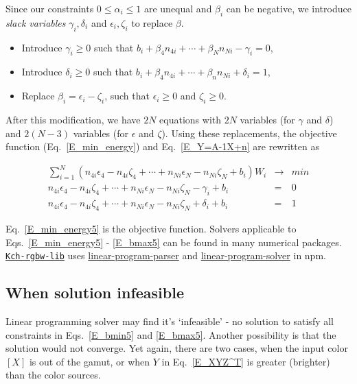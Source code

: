 \documentclass[dvipdfmx,uplatex,a4paper]{article}
\begin{document}
Since our constraints $0 \leq \alpha_i \leq 1$ are unequal and $\beta_i$ can be negative, we introduce \textit{slack variables} $\gamma_i, \delta_i$ and $\epsilon_i, \zeta_i$ to replace $\beta$.

\begin{itemize}
  \item Introduce $\gamma_i \geq 0$ such that $b_i + \beta_4 n_{4i} + \cdots + \beta_N n_{Ni} - \gamma_i = 0$,

  \item Introduce $\delta_i \geq 0$ such that $b_i + \beta_4 n_{4i} + \cdots + \beta_n n_{Ni} + \delta_i = 1$,

  \item Replace $\beta_i = \epsilon_i - \zeta_i$, such that $\epsilon_i \geq 0 $ and $\zeta_i \geq 0$.
\end{itemize}

After this modification, we have $2N$ equations with $2N$ variables (for $\gamma$ and $\delta$) and $2(N-3)$ variables (for $\epsilon$ and $\zeta$). Using these replacements, the objective function (Eq.~\eqref{E_min_energy}) and Eq.~\eqref{E_Y=A-1X+n} are rewritten as

\begin{eqnarray}
%
  \label{E_min_energy5}
  \sum_{i=1}^N (n_{4i} \epsilon_4 - n_{4i} \zeta_4 + \cdots +  n_{Ni} \epsilon_N - n_{Ni} \zeta_N + b_{i}) W_i &\to& min \\
%
  \label{E_bmin5}
  n_{4i} \epsilon_4  - n_{4i} \zeta_4 + \cdots + n_{Ni} \epsilon_N  - n_{Ni} \zeta_N  - \gamma_i + b_i &=& 0 \\
%
  \label{E_bmax5}
  n_{4i} \epsilon_4  - n_{4i} \zeta_4 + \cdots + n_{Ni} \epsilon_N  - n_{Ni} \zeta_N  + \delta_i + b_i &=& 1
\end{eqnarray}

\noindent
Eq.~\eqref{E_min_energy5} is the objective function. Solvers applicable to Eqs.~\eqref{E_min_energy5} - \eqref{E_bmax5} can be found in many numerical packages. \href{https://www.npmjs.com/package/kch-rgbw-lib}{\texttt{Kch-rgbw-lib}} uses \href{https://www.npmjs.com/package/linear-program-parser}{linear-program-parser} and \href{https://www.npmjs.com/package/linear-program-solver}{linear-program-solver} in npm.

\subsection{When solution infeasible}
Linear programming solver may find it's `infeasible' - no solution to satisfy all constraints in Eqs.~\eqref{E_bmin5} and \eqref{E_bmax5}. Another possibility is that the solution would not converge. Yet again, there are two cases, when the input color $[X]$ is out of the gamut, or when $Y$ in Eq.~\eqref{E_XYZ^T} is greater (brighter) than the color sources.
\end{document}
